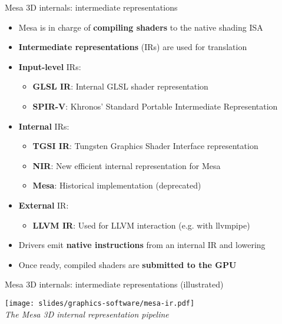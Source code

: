 \begin{frame}{Mesa 3D internals: intermediate representations}
  \begin{itemize}
  \item Mesa is in charge of \textbf{compiling shaders} to the native shading ISA
  \item \textbf{Intermediate representations} (IRs) are used for translation
  \item \textbf{Input-level} IRs:
    \begin{itemize}
    \item \textbf{GLSL IR}: Internal GLSL shader representation
    \item \textbf{SPIR-V}: Khronos' Standard Portable Intermediate Representation
    \end{itemize}
  \item \textbf{Internal} IRs:
    \begin{itemize}
    \item \textbf{TGSI IR}: Tungsten Graphics Shader Interface representation
    \item \textbf{NIR}: New efficient internal representation for Mesa
    \item \textbf{Mesa}: Historical implementation (deprecated)
    \end{itemize}
  \item \textbf{External} IR:
    \begin{itemize}
    \item \textbf{LLVM IR}: Used for LLVM interaction (e.g. with llvmpipe)
    \end{itemize}
  \item Drivers emit \textbf{native instructions} from an internal IR and lowering
  \item Once ready, compiled shaders are \textbf{submitted to the GPU}
  \end{itemize}
\end{frame}

\begin{frame}{Mesa 3D internals: intermediate representations (illustrated)}
  \begin{center}
  \texttt{[image: slides/graphics-software/mesa-ir.pdf]}\\
  \textit{\small The Mesa 3D internal representation pipeline}
  \end{center}
\end{frame}

